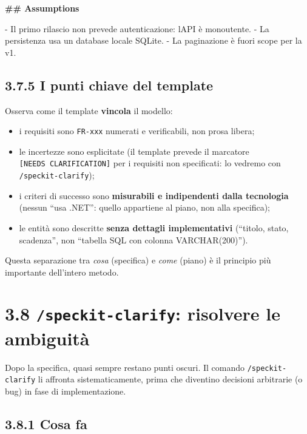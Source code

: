\documentclass[
  italian,
  10pt,
]{book}
\newenvironment{Shaded}{\begin{snugshade}}{\end{snugshade}}
\newcommand{\FunctionTok}[1]{\textcolor[rgb]{0.13,0.29,0.53}{\textbf{#1}}}
\newcommand{\NormalTok}[1]{#1}
\newcommand{\SpecialStringTok}[1]{\textcolor[rgb]{0.31,0.60,0.02}{#1}}
\providecommand{\tightlist}{%
  \setlength{\itemsep}{0pt}\setlength{\parskip}{0pt}}
\begin{document}
\begin{Shaded}
\begin{Highlighting}[]
\FunctionTok{\#\# Assumptions}

\SpecialStringTok{{-} }\NormalTok{Il primo rilascio non prevede autenticazione: l\textquotesingle{}API è monoutente.}
\SpecialStringTok{{-} }\NormalTok{La persistenza usa un database locale SQLite.}
\SpecialStringTok{{-} }\NormalTok{La paginazione è fuori scope per la v1.}
\end{Highlighting}
\end{Shaded}

\subsection{3.7.5 I punti chiave del
template}\label{i-punti-chiave-del-template}

Osserva come il template \textbf{vincola} il modello:

\begin{itemize}
\tightlist
\item
  i requisiti sono \texttt{FR-xxx} numerati e verificabili, non prosa
  libera;
\item
  le incertezze sono esplicitate (il template prevede il marcatore
  \texttt{{[}NEEDS\ CLARIFICATION{]}} per i requisiti non specificati:
  lo vedremo con \texttt{/speckit-clarify});
\item
  i criteri di successo sono \textbf{misurabili e indipendenti dalla
  tecnologia} (nessun ``usa .NET'': quello appartiene al piano, non alla
  specifica);
\item
  le entità sono descritte \textbf{senza dettagli implementativi}
  (``titolo, stato, scadenza'', non ``tabella SQL con colonna
  VARCHAR(200)'').
\end{itemize}

Questa separazione tra \emph{cosa} (specifica) e \emph{come} (piano) è
il principio più importante dell'intero metodo.

\section{\texorpdfstring{3.8 \texttt{/speckit-clarify}: risolvere le
ambiguità}{3.8 /speckit-clarify: risolvere le ambiguità}}\label{speckit-clarify-risolvere-le-ambiguituxe0}

Dopo la specifica, quasi sempre restano punti oscuri. Il comando
\texttt{/speckit-clarify} li affronta sistematicamente, prima che
diventino decisioni arbitrarie (o bug) in fase di implementazione.

\subsection{3.8.1 Cosa fa}\label{cosa-fa}
\end{document}
